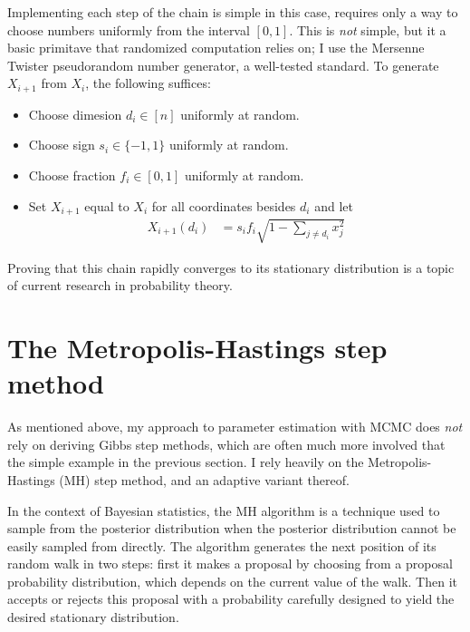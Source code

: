 Implementing each step of the chain is simple in this case, requires
only a way to choose numbers uniformly from the interval $[0,1]$.  This
is \emph{not} simple, but it a basic primitave that randomized
computation relies on; I use the Mersenne Twister pseudorandom number
generator, a well-tested standard.\cite{Matsumoto_Mersenne_1998}
To generate $X_{i+1}$ from $X_i$, the following suffices:
\begin{itemize}
\item Choose dimesion $d_i \in [n]$ uniformly at random.
\item Choose sign $s_i \in \{-1, 1\}$ uniformly at random.
\item Choose fraction $f_i \in [0,1]$ uniformly at random.
\item Set $X_{i+1}$ equal to $X_i$ for all coordinates besides $d_i$ and let
\begin{align*}
X_{i+1}(d_i) &= s_i f_i \sqrt{1 - \sum_{j\neq d_i} x_j^2}
\end{align*}
\end{itemize}

Proving that this chain rapidly converges to its stationary
distribution is a topic of current research in probability theory.

\section{The Metropolis-Hastings step method}
As mentioned above, my approach to parameter estimation with MCMC does
\emph{not} rely on deriving Gibbs step methods, which are often much
more involved that the simple example in the previous section.  I rely
heavily on the Metropolis-Hastings (MH) step method, and an adaptive
variant thereof.

In the context of Bayesian statistics, the MH
algorithm is a technique used to sample from the posterior
distribution when the posterior distribution cannot be easily sampled
from directly. The algorithm generates the next position of its random walk
in two steps: first it makes a proposal by choosing from a proposal
probability distribution, which depends on the current value of the
walk. Then it accepts or rejects this proposal with a probability
carefully designed to yield the desired stationary distribution.


